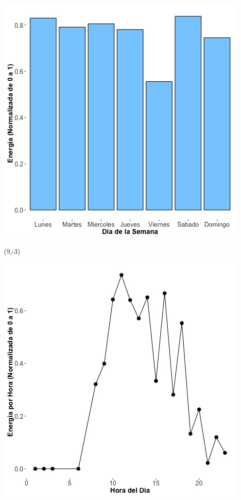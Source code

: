 \documentclass{article}\usepackage[]{graphicx}\usepackage[]{color}
\newenvironment{knitrout}{}{} %
\begin{document}
\begin{knitrout}
\color{fgcolor}
\includegraphics[scale=0.65]{figure/A24_day_of_week_plot} 
\end{knitrout}


 \begin{textblock}{1}(9,-3)
\begin{minipage}{20em}
\begingroup

\endgroup
\end{minipage}
\end{textblock}

 \vspace{2cm}

\begin{knitrout}
\color{fgcolor}
\includegraphics[scale=0.75]{figure/A24_fplot_norm_median} 
\end{knitrout}
\end{document}
